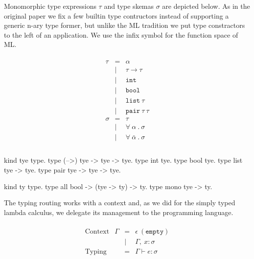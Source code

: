 \documentclass[a4paper, 11pt]{book}
\begin{document}
Monomorphic type expressions $\tau$ and type skemas $\sigma$
are depicted below. As in the original paper we fix a few builtin type contructors
instead of supporting a generic n-ary type former, but unlike
the ML tradition we put type constractors to the left of an application.
We use the infix symbol \elpi{-->} for the function space of ML.

\begin{center}
\begin{minipage}{0.4\textwidth}
$$
\begin{array}{lrl}
  \\
    \tau   &=     & \alpha                    \\
                              &\vert &  \tau \to \tau         \\
                              &\vert &  \mathtt{int}         \\
                              &\vert &  \mathtt{bool}         \\
                              &\vert &  \mathtt{list}\ \tau         \\
                              &\vert &  \mathtt{pair}\ \tau\ \tau         \\
  
     \sigma &=    & \tau                                           \\
                             &\vert& \forall\ \alpha\ .\ \sigma \\
                            &\vert& \forall\ \bar\alpha\ .\ \sigma \\
  \\
\end{array}
$$
\end{minipage}
\begin{minipage}{0.5\textwidth}
\begin{elpicodelj}
kind tye type.
type (-->) tye -> tye -> tye.  
type int   tye.
type bool  tye.
type list  tye -> tye.
type pair  tye -> tye -> tye.

kind ty type.
type all    bool -> (tye -> ty) -> ty.
type mono   tye -> ty.
\end{elpicodelj}
\end{minipage}
\end{center}


The typing routing works with a context and, as we did for the
simply typed lambda calculus, we delegate its management to the
programming language.

$$
\begin{array}{llrl}
  \\
    \text{Context}     & \Gamma & = & \epsilon\ \mathtt{(empty)}\\
                       &        & \vert& \Gamma,\ x : \sigma\\
    \text{Typing}      &        & = & \Gamma \vdash e : \sigma\\
  \\
  \end{array}
$$
\end{document}
